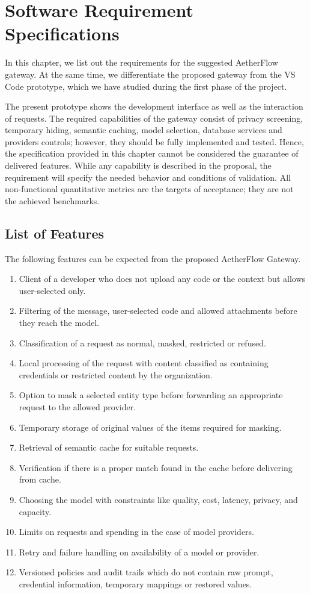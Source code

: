 \documentclass{FastFyp}
\begin{document}
\chapter{Software Requirement Specifications}
\label{ch:srs}
In this chapter, we list out the requirements for the suggested AetherFlow gateway.
At the same time, we differentiate the proposed gateway from the VS Code prototype,
which we have studied during the first phase of the project.

The present prototype shows the development interface as well as the interaction
of requests. The required capabilities of the gateway consist of privacy screening,
temporary hiding, semantic caching, model selection, database services and providers
controls; however, they should be fully implemented and tested.
Hence, the specification provided in this chapter cannot be considered the
guarantee of delivered features. While any capability is described in the proposal,
the requirement will specify the needed behavior and conditions of validation.
All non-functional quantitative metrics are the targets of acceptance; they are not
the achieved benchmarks.

\section{List of Features}
\label{sec:list-of-features}
The following features can be expected from the proposed AetherFlow Gateway.
\begin{enumerate}
\item Client of a developer who does not upload any code or the context but
      allows user-selected only.
\item Filtering of the message, user-selected code and allowed attachments
      before they reach the model.
\item Classification of a request as normal, masked, restricted or refused.
\item Local processing of the request with content classified as containing
      credentials or restricted content by the organization.
\item Option to mask a selected entity type before forwarding an
      appropriate request to the allowed provider.
\item Temporary storage of original values of the items required for masking.
\item Retrieval of semantic cache for suitable requests.
\item Verification if there is a proper match found in the cache before
      delivering from cache.
\item Choosing the model with constraints like quality, cost, latency,
      privacy, and capacity.
\item Limits on requests and spending in the case of model providers.
\item Retry and failure handling on availability of a model or provider.
\item Versioned policies and audit trails which do not contain raw prompt,
      credential information, temporary mappings or restored values.
\end{enumerate}
\end{document}
